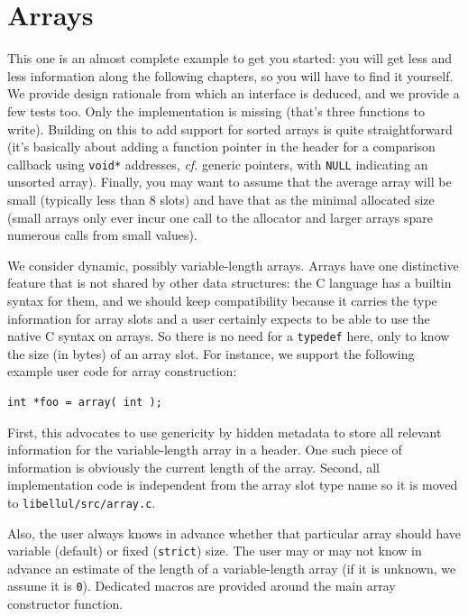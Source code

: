 \chapter{Arrays}\label{chap:arrays}

This one is an almost complete example to get you started: you will get less and less information along the following chapters, so you will have to find it yourself. We provide design rationale from which an interface is deduced, and we provide a few tests too. Only the implementation is missing (that's three functions to write). Building on this to add support for sorted arrays is quite straightforward (it's basically about adding a function pointer in the header for a comparison callback using \texttt{void*} addresses, \textit{cf.} generic pointers, with \texttt{NULL} indicating an unsorted array). Finally, you may want to assume that the average array will be small (typically less than 8 slots) and have that as the minimal allocated size (small arrays only ever incur one call to the allocator and larger arrays spare numerous calls from small values).

We consider dynamic, possibly variable-length arrays. Arrays have one distinctive feature that is not shared by other data structures: the C language has a builtin syntax for them, and we should keep compatibility because it carries the type information for array slots and a user certainly expects to be able to use the native C syntax on arrays. So there is no need for a \texttt{typedef} here, only to know the size (in bytes) of an array slot. For instance, we support the following example user code for array construction:
\begin{lstlisting}[style=C]
int *foo = array( int );
\end{lstlisting}

First, this advocates to use genericity by hidden metadata to store all relevant information for the variable-length array in a header. One such piece of information is obviously the current length of the array. Second, all implementation code is independent from the array slot type name so it is moved to \texttt{libellul/src/array.c}. 

Also, the user always knows in advance whether that particular array should have variable (default) or fixed (\texttt{strict}) size. The user may or may not know in advance an estimate of the length of a variable-length array (if it is unknown, we assume it is \texttt{0}). Dedicated macros are provided around the main array constructor function. 

